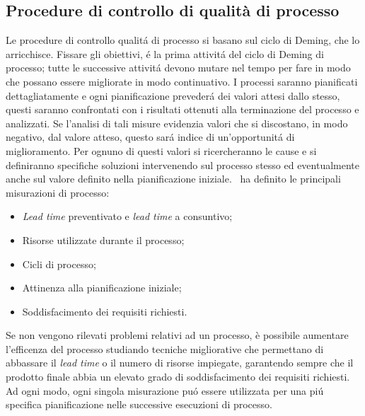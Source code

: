\subsection{Procedure di controllo di qualità di processo}
Le procedure di controllo qualit\'a di processo si basano sul ciclo di Deming, che lo arricchisce. Fissare gli obiettivi, \'e la prima attivit\'a del ciclo di Deming di processo; tutte le successive attivit\'a devono mutare nel tempo per fare in modo che possano essere migliorate in modo continuativo. I processi saranno pianificati dettagliatamente e ogni pianificazione preveder\'a dei valori attesi dallo stesso, questi saranno confrontati con i risultati ottenuti alla terminazione del processo e analizzati. Se l'analisi di tali misure evidenzia valori che si discostano, in modo negativo, dal valore atteso, questo sar\'a indice di un'opportunit\'a di miglioramento. Per ognuno di questi valori si ricercheranno le cause e si definiranno specifiche soluzioni intervenendo sul processo stesso ed eventualmente anche sul valore definito nella pianificazione iniziale.
\gruppo ~ha definito le principali misurazioni di processo:
\begin{itemize}
\item \textit{Lead time} preventivato e \textit{lead time} a consuntivo;
\item Risorse utilizzate durante il processo;
\item Cicli di processo;
\item Attinenza alla pianificazione iniziale;
\item Soddisfacimento dei requisiti richiesti.
\end{itemize}
Se non vengono rilevati problemi relativi ad un processo, è possibile aumentare l'efficenza del processo studiando tecniche migliorative che permettano di abbassare il \textit{lead time} o il numero di risorse impiegate, garantendo sempre che il prodotto finale abbia un elevato grado di soddisfacimento dei requisiti richiesti. Ad ogni modo, ogni singola misurazione pu\'o essere utilizzata per una pi\'u specifica pianificazione nelle successive esecuzioni di processo.